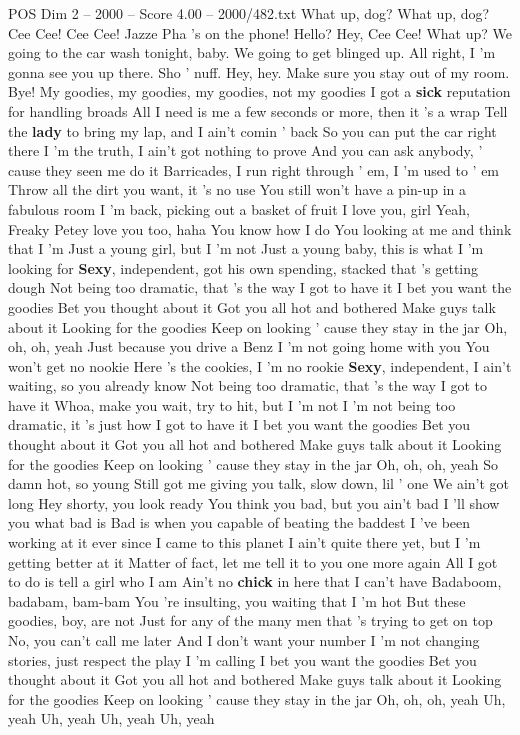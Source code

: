 \begin{textsample}{POS Dim 2 – 2000 – Score 4.00 – 2000/482.txt}  \label{ex:f2_pos_001}
What up, dog?
What up, dog?
Cee Cee!
Cee Cee!
Jazze Pha 's on the phone!
Hello?
Hey, Cee Cee!
What up?
We going to the car wash tonight, baby.
We going to get blinged up.
All right, I 'm gonna see you up there.
Sho ' nuff.
Hey, hey.
Make sure you stay out of my room.
Bye!
My goodies, my goodies, my goodies, not my goodies I got a \textbf{sick} reputation for handling broads All I need is me a few seconds or more, then it 's a wrap Tell the \textbf{lady} to bring my lap, and I ain't comin ' back So you can put the car right there I 'm the truth, I ain't got nothing to prove And you can ask anybody, ' cause they seen me do it Barricades, I run right through ' em, I 'm used to ' em Throw all the dirt you want, it 's no use You still won't have a pin-up in a fabulous room I 'm back, picking out a basket of fruit I love you, girl Yeah, Freaky Petey love you too, haha You know how I do You looking at me and think that I 'm Just a young girl, but I 'm not Just a young baby, this is what I 'm looking for \textbf{Sexy}, independent, got his own spending, stacked that 's getting dough Not being too dramatic, that 's the way I got to have it I bet you want the goodies Bet you thought about it Got you all hot and bothered Make guys talk about it Looking for the goodies Keep on looking ' cause they stay in the jar Oh, oh, oh, yeah Just because you drive a Benz I 'm not going home with you You won't get no nookie Here 's the cookies, I 'm no rookie \textbf{Sexy}, independent, I ain't waiting, so you already know Not being too dramatic, that 's the way I got to have it Whoa, make you wait, try to hit, but I 'm not I 'm not being too dramatic, it 's just how I got to have it I bet you want the goodies Bet you thought about it Got you all hot and bothered Make guys talk about it Looking for the goodies Keep on looking ' cause they stay in the jar Oh, oh, oh, yeah So damn hot, so young Still got me giving you talk, slow down, lil ' one We ain't got long Hey shorty, you look ready You think you bad, but you ain't bad I 'll show you what bad is Bad is when you capable of beating the baddest I 've been working at it ever since I came to this planet I ain't quite there yet, but I 'm getting better at it Matter of fact, let me tell it to you one more again All I got to do is tell a girl who I am Ain't no \textbf{chick} in here that I can't have Badaboom, badabam, bam-bam You 're insulting, you waiting that I 'm hot But these goodies, boy, are not Just for any of the many men that 's trying to get on top No, you can't call me later And I don't want your number I 'm not changing stories, just respect the play I 'm calling I bet you want the goodies Bet you thought about it Got you all hot and bothered Make guys talk about it Looking for the goodies Keep on looking ' cause they stay in the jar Oh, oh, oh, yeah Uh, yeah Uh, yeah Uh, yeah Uh, yeah

\end{textsample}
